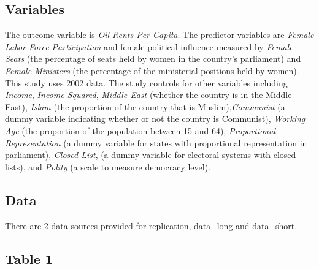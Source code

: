 \documentclass[12pt,letterpaper]{article}
\begin{document}
	\subsection*{Variables}
	
	\vspace{.25cm}
	
	\noindent The outcome variable is \textit{Oil Rents Per Capita}. The  predictor variables are \textit{Female Labor Force Participation} and female political influence measured by \textit{Female Seats} (the percentage of seats held by women in the country's parliament) and \textit{Female Ministers} (the percentage of the ministerial positions held by women). This study uses 2002 data. The study controls for other variables including \textit{Income}, \textit{Income Squared}, \textit{Middle East} (whether the country is in the Middle East), \textit{Islam} (the proportion of the country that is Muslim),\textit{Communist} (a dummy variable indicating whether or not the country is Communist), \textit{Working Age} (the proportion of the population between 15 and 64), \textit{Proportional Representation} (a dummy variable for states with proportional representation in parliament), \textit{Closed List}, (a dummy variable for electoral systems with closed lists), and \textit{Polity} (a scale to measure democracy level).

	\subsection*{Data}
	
	\vspace{.25cm}
	
	\noindent There are 2 data sources provided for replication, data\_long and data\_short.

	
	
	\subsection*{Table 1}
	
	
\end{document}
